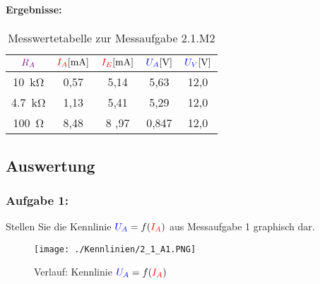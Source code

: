 \documentclass[a4paper,titlepage,parskip]{scrreprt}
\newcommand{\spannung}[1]{\textcolor{blue}{#1}}
\newcommand{\strom}[1]{\textcolor{red}{#1}}
\newcommand{\widerstand}[1]{\textcolor{violet}{#1}}
\begin{document}
               \paragraph{Ergebnisse:}
                   \begin{center}
                       \begin{table}[!hbtp]
                           \caption{Messwertetabelle zur Messaufgabe 2.1.M2}
                           \label{tbl:messergebnisse2.2}
                           \renewcommand{\arraystretch}{1.3}
                           \begin{center}
                               \begin{tabular}{c|cccc}
                                   $\widerstand{R_A}$&
                                   $\strom{I_A} [\si{\milli\ampere}]$  &
                                   $\strom{I_E} [\si{\milli\ampere}]$ &
                                   $\spannung{U_A} [\si{\volt}]$ &
                                   $\spannung{U_V} [\si{\volt}]$ \\ \hline

                                   \SI{10}{\kilo\ohm} & 0,57 & 5,14 & 5,63 & 12,0\\
                                   \SI{4,7}{\kilo\ohm} & 1,13 & 5,41 & 5,29 & 12,0\\
                                   \SI{100}{\ohm} & 8,48 &8 ,97 & 0,847 & 12,0\\

                               \end{tabular}
                           \end{center}
                       \end{table}
                   \end{center}
         \subsection{Auswertung}
           \subsubsection{Aufgabe 1:} Stellen Sie die Kennlinie $\spannung{U_A} = f(\strom{I_A})$ aus Messaufgabe 1 graphisch dar.

               \begin{figure}[!htbp]
                   \begin{center}
                   \texttt{[image: ./Kennlinien/2\_1\_A1.PNG]}

                   \caption{Verlauf: Kennlinie $\spannung{U_A} = f(\strom{I_A})$}

                   \label{fig:EG_MC}
                \end{center}
            \end{figure}
\end{document}
